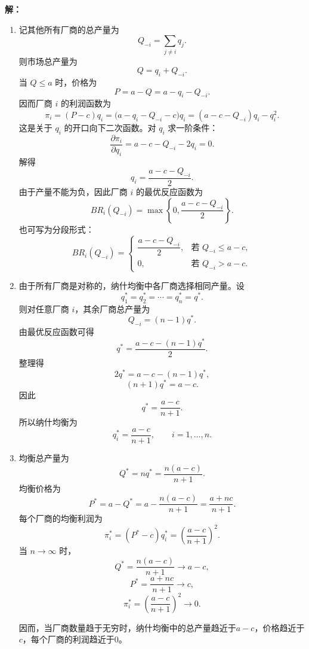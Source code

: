 \documentclass[12pt,a4paper]{article}
\begin{document}
\vspace{0.5cm}

\noindent\textbf{解：}
\begin{enumerate}[label=\alph*.]
  \item
  记其他所有厂商的总产量为
  \[
  Q_{-i}=\sum_{j\ne i} q_j.
  \]
  则市场总产量为
  \[
  Q=q_i+Q_{-i}.
  \]
  当 \(Q\le a\) 时，价格为
  \[
  P=a-Q=a-q_i-Q_{-i}.
  \]
  因而厂商 \(i\) 的利润函数为
  \[
  \pi_i=(P-c)q_i
  =\bigl(a-q_i-Q_{-i}-c\bigr)q_i
  =(a-c-Q_{-i})q_i-q_i^2.
  \]
  这是关于 \(q_i\) 的开口向下二次函数。对 \(q_i\) 求一阶条件：
  \[
  \frac{\partial \pi_i}{\partial q_i}
  =a-c-Q_{-i}-2q_i=0.
  \]
  解得
  \[
  q_i=\frac{a-c-Q_{-i}}{2}.
  \]
  由于产量不能为负，因此厂商 \(i\) 的最优反应函数为
  \[
  BR_i(Q_{-i})
  =\max\left\{0,\frac{a-c-Q_{-i}}{2}\right\}.
  \]
  也可写为分段形式：
  \[
  BR_i(Q_{-i})=
  \begin{cases}
    \dfrac{a-c-Q_{-i}}{2}, & \text{若 } Q_{-i}\le a-c,\\[6pt]
    0, & \text{若 } Q_{-i}>a-c.
  \end{cases}
  \]

  \item
  由于所有厂商是对称的，纳什均衡中各厂商选择相同产量。设
  \[
  q_1^*=q_2^*=\cdots=q_n^*=q^*.
  \]
  则对任意厂商 \(i\)，其余厂商总产量为
  \[
  Q_{-i}=(n-1)q^*.
  \]
  由最优反应函数可得
  \[
  q^*=\frac{a-c-(n-1)q^*}{2}.
  \]
  整理得
  \[
  2q^*=a-c-(n-1)q^*,
  \]
  \[
  (n+1)q^*=a-c.
  \]
  因此
  \[
  q^*=\frac{a-c}{n+1}.
  \]
  所以纳什均衡为
  \[
  q_i^*=\frac{a-c}{n+1},\qquad i=1,\dots,n.
  \]

  \item
  均衡总产量为
  \[
  Q^*=nq^*=\frac{n(a-c)}{n+1}.
  \]
  均衡价格为
  \[
  P^*=a-Q^*
  =a-\frac{n(a-c)}{n+1}
  =\frac{a+nc}{n+1}.
  \]
  每个厂商的均衡利润为
  \[
  \pi_i^*=(P^*-c)q_i^*=\left(\frac{a-c}{n+1}\right)^2.
  \]
  当 \(n\to\infty\) 时，
  \[
  Q^*=\frac{n(a-c)}{n+1}\to a-c,
  \]
  \[
  P^*=\frac{a+nc}{n+1}\to c,
  \]
  \[
  \pi_i^*=\left(\frac{a-c}{n+1}\right)^2\to 0.
  \]

  因而，当厂商数量趋于无穷时，纳什均衡中的总产量趋近于$a-c$，价格趋近于$c$，每个厂商的利润趋近于$0$。
\end{enumerate}

\end{document}
